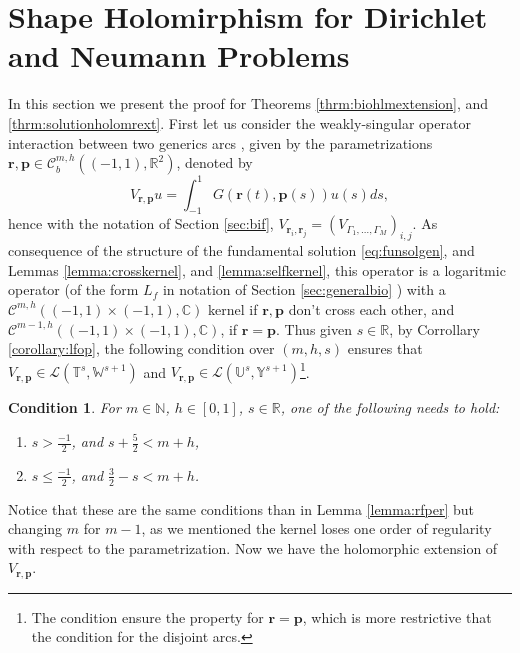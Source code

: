 \documentclass{article}
\newtheorem{condition}[theorem]{Condition}
\newcommand{\IC}{{\mathbb C}}
\newcommand{\IN}{{\mathbb N}}
\newcommand{\IR}{{\mathbb R}}
\newcommand{\IU}{{\mathbb U}}
\newcommand{\IT}{{\mathbb T}}
\newcommand{\IW}{{\mathbb W}}
\newcommand{\IY}{{\mathbb Y}}
\newcommand{\bp}{{\bm p}}
\newcommand{\cmspaceh}[4]{\mathcal{C}^{#1,#2} \left( #3, #4 \right)}
\newcommand{\rgeoh}[2]{\mathcal{C}_b^{#1,#2}\left( (-1,1), \IR^2 \right)}
\newcommand{\br}{\bm{r}}
\newcommand{\iinterv}{(-1,1)\times(-1,1)}
\begin{document}
\section{Shape Holomirphism for Dirichlet and Neumann Problems}
\label{sec:ophlrmf}
In this section we present the proof for Theorems \ref{thrm:biohlmextension}, and \ref{thrm:solutionholomrext}. First let us consider the weakly-singular operator interaction between two generics arcs , given by the parametrizations $\br,\bp \in \rgeoh{m}{h}$, denoted by 
$$V_{\br,\bp}u  = \int_{-1}^1G(\br(t),\bp(s)) u(s) ds,$$
hence with the notation of Section \ref{sec:bif}, $V_{\br_i, \br_j} = (V_{\Gamma_1,\hdots,\Gamma_M})_{i,j}$. As consequence of the structure of the fundamental solution \eqref{eq:funsolgen}, and Lemmas \ref{lemma:crosskernel}, and \ref{lemma:selfkernel}, this operator is a logaritmic operator (of the form $L_f$ in notation of Section \ref{sec:generalbio} ) with a $\cmspaceh{m}{h}{\iinterv}{\IC}$ kernel if $\br ,\bp$ don't cross each other, and $\cmspaceh{m-1}{h}{\iinterv}{\IC}$, if $\br = \bp$. Thus given $s \in \IR$,   by Corrollary \ref{corollary:lfop}, the following condition over $(m,h,s)$ ensures that $V_{\br,\bp} \in \mathcal{L}\left(\IT^s,\IW^{s+1}\right)$ and $V_{\br,\bp} \in \mathcal{L}\left(\IU^s,\IY^{s+1}\right)$\footnote{The condition ensure the property for $\br = \bp$, which is more restrictive that the condition for the disjoint arcs.}.
\begin{condition}
\label{condition:smh}
For $m \in \IN$, $h \in [0,1]$, $s \in \IR$, one of the following needs to hold:
\begin{enumerate}
\item[i.] 
$s > \frac{-1}{2}$, and $s+
\frac{5}{2}<m+h$,
\item[ii.] 
$ s \leq \frac{-1}{2}$, and $\frac{3}{2} -s < m+h$.
\end{enumerate}
\end{condition}
Notice that these are the same conditions than in Lemma \ref{lemma:rfper} but changing $m$ for $m-1$, as we mentioned the kernel loses one order of regularity with respect to the parametrization.  Now we have the holomorphic extension of $V_{\br,\bp}$.
\end{document}
